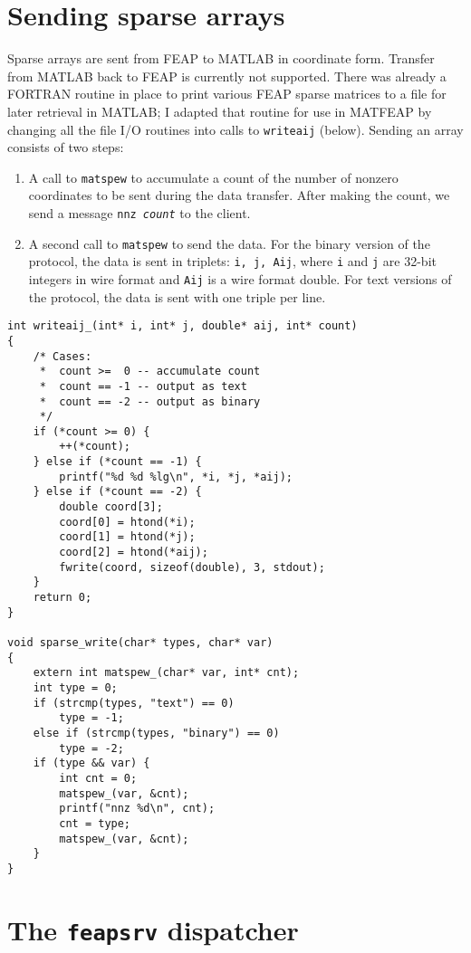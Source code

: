 \section{Sending sparse arrays}

Sparse arrays are sent from FEAP to MATLAB in coordinate form.  Transfer
from MATLAB back to FEAP is currently not supported.  There was already
a FORTRAN routine in place to print various FEAP sparse matrices to a
file for later retrieval in MATLAB; I adapted that routine for use in
MATFEAP by changing all the file I/O routines into calls to {\tt writeaij}
(below).  Sending an array consists of two steps: 
\begin{enumerate}
\item 
A call to {\tt matspew} to accumulate a count of the number
of nonzero coordinates to be sent during the data transfer.
After making the count, we send a message {\tt nnz {\it count}} to
the client.
\item 
A second call to {\tt matspew} to send the data.  For the binary version
of the protocol, the data is sent in triplets: {\tt i, j, Aij},
where {\tt i} and {\tt j} are 32-bit integers in wire format and
{\tt Aij} is a wire format double.  For text versions of the protocol,
the data is sent with one triple per line.
\end{enumerate}

\begin{verbatim}
int writeaij_(int* i, int* j, double* aij, int* count)
{
    /* Cases:
     *  count >=  0 -- accumulate count
     *  count == -1 -- output as text
     *  count == -2 -- output as binary
     */
    if (*count >= 0) {
        ++(*count);
    } else if (*count == -1) {
        printf("%d %d %lg\n", *i, *j, *aij);
    } else if (*count == -2) {
        double coord[3];
        coord[0] = htond(*i);
        coord[1] = htond(*j);
        coord[2] = htond(*aij);
        fwrite(coord, sizeof(double), 3, stdout);
    }
    return 0;
}

void sparse_write(char* types, char* var)
{
    extern int matspew_(char* var, int* cnt);
    int type = 0;
    if (strcmp(types, "text") == 0)
        type = -1;
    else if (strcmp(types, "binary") == 0)
        type = -2;
    if (type && var) {
        int cnt = 0;
        matspew_(var, &cnt);
        printf("nnz %d\n", cnt);
        cnt = type;
        matspew_(var, &cnt);
    }
}

\end{verbatim}
\section{The {\tt feapsrv} dispatcher}

